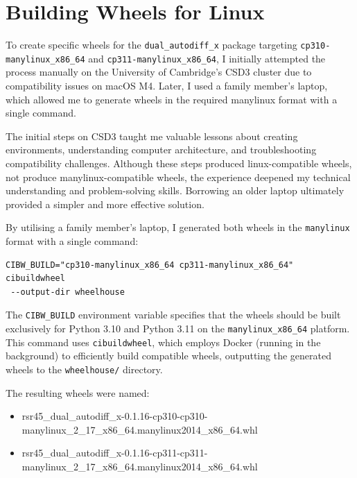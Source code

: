 \documentclass[a4paper,12pt]{article}
\begin{document}
\section{Building Wheels for Linux}

To create specific wheels for the \texttt{dual\_autodiff\_x} package targeting \texttt{cp310-manylinux\_x86\_64} and \texttt{cp311-manylinux\_x86\_64}, I initially attempted the process manually on the University of Cambridge's CSD3 cluster due to compatibility issues on macOS M4. Later, I used a family member's laptop, which allowed me to generate wheels in the required manylinux format with a single command.

The initial steps on CSD3 taught me valuable lessons about creating environments, understanding computer architecture, and troubleshooting compatibility challenges. Although these steps produced linux-compatible wheels, not produce manylinux-compatible wheels, the experience deepened my technical understanding and problem-solving skills. Borrowing an older laptop ultimately provided a simpler and more effective solution.


By utilising a family member's laptop, I generated both wheels in the \texttt{manylinux} format with a single command:
\begin{verbatim}
CIBW_BUILD="cp310-manylinux_x86_64 cp311-manylinux_x86_64" cibuildwheel
 --output-dir wheelhouse
\end{verbatim}
The \texttt{CIBW\_BUILD} environment variable specifies that the wheels should be built exclusively for Python 3.10 and Python 3.11 on the \texttt{manylinux\_x86\_64} platform. This command uses \texttt{cibuildwheel}, which employs Docker (running in the background) to efficiently build compatible wheels, outputting the generated wheels to the \texttt{wheelhouse/} directory.

The resulting wheels were named:
\begin{itemize}
    \item rsr45\_dual\_autodiff\_x-0.1.16-cp310-cp310-manylinux\_2\_17\_x86\_64.manylinux2014\_x86\_64.whl
    \item rsr45\_dual\_autodiff\_x-0.1.16-cp311-cp311-manylinux\_2\_17\_x86\_64.manylinux2014\_x86\_64.whl
\end{itemize}
\end{document}
